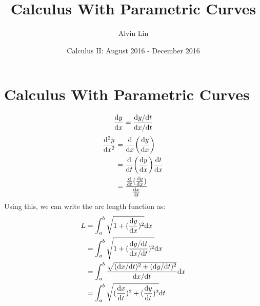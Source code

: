 \documentclass{math}
\title{Calculus With Parametric Curves}
\author{Alvin Lin}
\date{Calculus II: August 2016 - December 2016}
\begin{document}
\maketitle

\section*{Calculus With Parametric Curves}
\[ \frac{\mathrm{d}{y}}{\mathrm{d}{x}} = \frac{\mathrm{d}{y}/\mathrm{d}{t}}{\mathrm{d}{x}/\mathrm{d}{t}} \]
\begin{align*}
  \frac{\mathrm{d^2}{y}}{\mathrm{d}{x}^{2}} &=
    \frac{\mathrm{d}}{\mathrm{d}{x}}\bigg(\frac{\mathrm{d}{y}}{\mathrm{d}{x}}\bigg) \\
  &= \frac{\mathrm{d}}{\mathrm{d}{t}}\bigg(\frac{\mathrm{d}{y}}{\mathrm{d}{x}}\bigg)
     \frac{\mathrm{d}{t}}{\mathrm{d}{x}} \\
  &= \frac{\frac{\mathrm{d}}{\mathrm{d}{t}}(\frac{\mathrm{d}{y}}{\mathrm{d}{x}})}
      {\frac{\mathrm{d}{x}}{\mathrm{d}{t}}} \\
\end{align*}
Using this, we can write the arc length function as:
\begin{align*}
  L &= \int_{a}^{b}{\sqrt{1+(\frac{\mathrm{d}{y}}{\mathrm{d}{x}})^{2}}\mathrm{d}{x}} \\
  &= \int_{a}^{b}{
    \sqrt{1+(\frac{\mathrm{d}{y}/\mathrm{d}{t}}{\mathrm{d}{x}/\mathrm{d}{t}})^{2}}\mathrm{d}{x}} \\
  &= \int_{a}^{b}{\frac{
    \sqrt{(\mathrm{d}{x}/\mathrm{d}{t})^{2}+(\mathrm{d}{y}/\mathrm{d}{t})^{2}}
  }{\mathrm{d}{x}/\mathrm{d}{t}}\mathrm{d}{x}} \\
  &= \int_{a}^{b}{\sqrt{
    (\frac{\mathrm{d}{x}}{\mathrm{d}{t}})^{2}+(\frac{\mathrm{d}{y}}{\mathrm{d}{t}})^{2}}\mathrm{d}{t}}
\end{align*}
\end{document}
